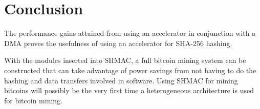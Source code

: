 \chapter{Conclusion}

The performance gains attained from using an accelerator in conjunction with a DMA
proves the usefulness of using an accelerator for SHA-256 hashing.

With the modules inserted into SHMAC, a full bitcoin mining system can be
constructed that can take advantage of power savings from not having to do
the hashing and data transfers involved in software. Using SHMAC for mining
bitcoins will possibly be the very first time a heterogeneous architecture
is used for bitcoin mining.

